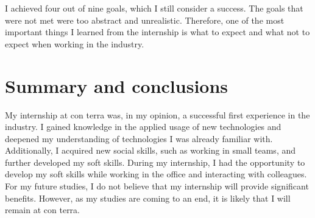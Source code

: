 \documentclass[11pt, titlepage, a4paper]{article}
\begin{document}
I achieved four out of nine goals, which I still consider a success. The goals that were not met were too abstract and unrealistic. Therefore, one of the most important things I learned from the internship is what to expect and what not to expect when working in the industry.

\section{Summary and conclusions}

My internship at con terra was, in my opinion, a successful first experience in the industry. I gained knowledge in the applied usage of new technologies and deepened my understanding of technologies I was already familiar with. Additionally, I acquired new social skills, such as working in small teams, and further developed my soft skills. During my internship, I had the opportunity to develop my soft skills while working in the office and interacting with colleagues. 
For my future studies, I do not believe that my internship will provide significant benefits. However, as my studies are coming to an end, it is likely that I will remain at con terra. 


\clearpage



\end{document}
